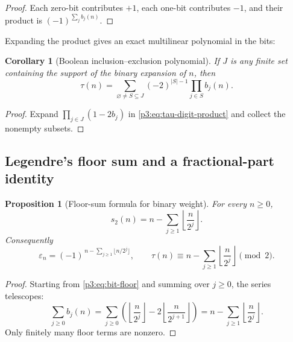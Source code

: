 \documentclass[11pt,oneside]{article}
\newtheorem{proposition}[theorem]{Proposition}
\newtheorem{corollary}[theorem]{Corollary}
\theoremstyle{definition}
\theoremstyle{remark}
\newcommand{\swt}{s_2}
\newcommand{\eps}{\varepsilon}
\newcommand{\1}{\mathbf 1}
\begin{document}
\begin{proof}
Each zero-bit contributes \(+1\), each one-bit contributes \(-1\), and their product is
\((-1)^{\sum_jb_j(n)}\).
\end{proof}

Expanding the product gives an exact multilinear polynomial in the bits:
\begin{corollary}[Boolean inclusion--exclusion polynomial]
\label{p3:cor:boolean-poly}
If \(J\) is any finite set containing the support of the binary expansion of \(n\), then
\begin{equation}
 \tau(n)=
 \sum_{\varnothing\ne S\subseteq J}
 (-2)^{|S|-1}\prod_{j\in S}b_j(n).
 \label{p3:eq:boolean-poly}
\end{equation}
\end{corollary}

\begin{proof}
Expand \(\prod_{j\in J}(1-2b_j)\) in \eqref{p3:eq:tau-digit-product} and collect the nonempty
subsets.
\end{proof}

\subsection{Legendre's floor sum and a fractional-part identity}

\begin{proposition}[Floor-sum formula for binary weight]
\label{p3:prop:floor-weight}
For every \(n\ge0\),
\begin{equation}
 \swt(n)=n-\sum_{j\ge1}\left\lfloor\frac{n}{2^j}\right\rfloor.
 \label{p3:eq:weight-floor}
\end{equation}
Consequently
\begin{equation}
 \boxed{
 \eps_n=(-1)^{\,n-\sum_{j\ge1}\lfloor n/2^j\rfloor},
 \qquad
 \tau(n)\equiv n-\sum_{j\ge1}\left\lfloor\frac{n}{2^j}\right\rfloor\pmod2.}
 \label{p3:eq:floor-sign}
\end{equation}
\end{proposition}

\begin{proof}
Starting from \eqref{p3:eq:bit-floor} and summing over \(j\ge0\), the series telescopes:
\[
 \sum_{j\ge0}b_j(n)
 =\sum_{j\ge0}\left(\left\lfloor\frac n{2^j}\right\rfloor
       -2\left\lfloor\frac n{2^{j+1}}\right\rfloor\right)
 =n-\sum_{j\ge1}\left\lfloor\frac n{2^j}\right\rfloor.
\]
Only finitely many floor terms are nonzero.
\end{proof}
\end{document}
